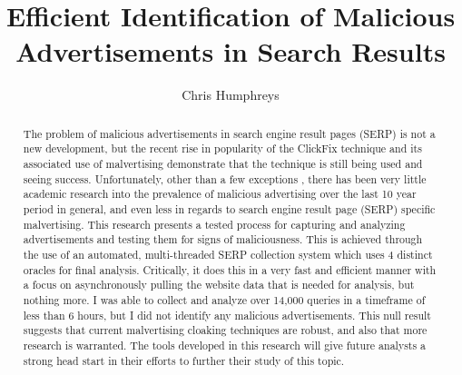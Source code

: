 \documentclass[sigconf]{acmart}
\begin{document}
\title{Efficient Identification of Malicious Advertisements in Search Results}


\author{Chris Humphreys}


\begin{abstract}
  The problem of malicious advertisements in search engine result pages (SERP)
  is not a new development, but the recent rise in popularity of the ClickFix
  technique and its associated use of malvertising
  \cite{abrams_2026_cluade_clickfix} demonstrate that the technique is still
  being used and seeing success.
  Unfortunately, other than a few exceptions \cite{kumari_2024_ml_classification}
  \cite{huang_2020_bayesian_game}\cite{blancaflor_2024_ai_chat}, there has been
  very little academic research into the prevalence of malicious advertising
  over the last 10 year period in general, and even less in regards to search
  engine result page (SERP) specific malvertising. This research presents a
  tested process for capturing and analyzing advertisements and testing them for
  signs of maliciousness. This is achieved through the use of an automated,
  multi-threaded SERP collection system which uses 4 distinct oracles for final
  analysis.
  Critically, it does this in a very fast and efficient
  manner with a focus on asynchronously pulling the website data that is needed
  for analysis, but nothing more.
  I was able to collect and analyze over 14,000 queries in a timeframe of less
  than 6 hours, but I did not identify any malicious advertisements.
  This null result suggests that current malvertising cloaking techniques
  are robust, and also that more research is warranted.
  The tools developed in this research will give future analysts
  a strong head start in their efforts to further their study of this topic.
\end{abstract}
\end{document}

